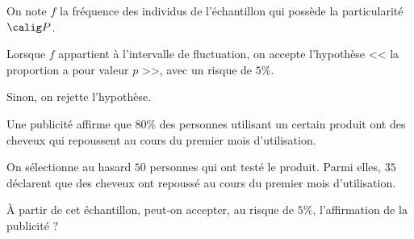 \documentclass[10pt,openright,twoside,french]{book}
\begin{document}
 \begin{Prop}
    On note $f$ la fréquence des individus de l'échantillon qui possède la particularité $\calig P$.\par
    Lorsque $f$ appartient à l'intervalle de fluctuation, on accepte l'hypothèse << la proportion a pour valeur $p$ >>, avec un risque de $5\%$.\par
    Sinon, on rejette l'hypothèse.
 \end{Prop}
 
 \begin{Exemple}
    Une publicité affirme que $80\%$ des personnes utilisant un certain produit ont des cheveux qui repoussent au cours du premier mois d'utilisation.\par
    On sélectionne au hasard $50$ personnes qui ont testé le produit. Parmi elles, $35$ déclarent que des cheveux ont repoussé au cours du premier mois d'utilisation.\par
    À partir de cet échantillon, peut-on accepter, au risque de $5\%$, l'affirmation de la publicité ?
 \end{Exemple}
\end{document}
